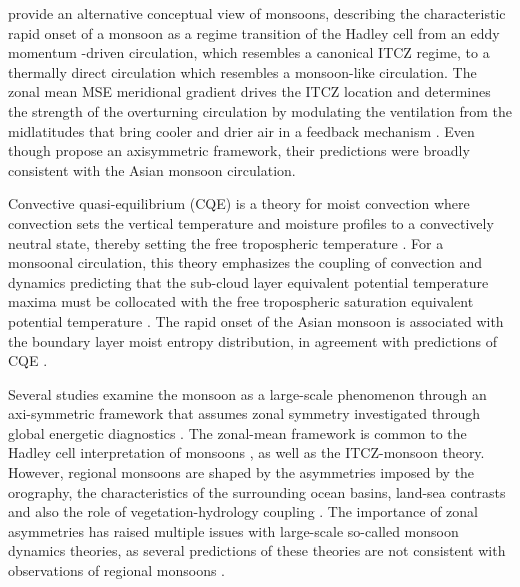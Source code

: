\cite{bordoni2008monsoons} provide an alternative conceptual view of monsoons, describing the characteristic rapid onset of a monsoon as a regime transition of the Hadley cell from an eddy momentum -driven circulation, which resembles a canonical ITCZ regime, to a thermally direct circulation which resembles a monsoon-like circulation. The zonal mean MSE meridional gradient drives the ITCZ location and determines the strength of the overturning circulation by modulating the ventilation from the midlatitudes that bring cooler and drier air in a feedback mechanism \citep{geen2020}. Even though \cite{bordoni2008monsoons} propose an axisymmetric framework, their predictions were broadly consistent with the Asian monsoon circulation. 


Convective quasi-equilibrium (CQE) is a theory for moist convection where convection sets the vertical temperature and moisture profiles to a convectively neutral state, thereby setting the free tropospheric temperature \citep{neelin2007moist}. For a monsoonal circulation, this theory emphasizes the coupling of convection and dynamics predicting that the sub-cloud layer equivalent potential temperature maxima must be collocated with the free tropospheric saturation equivalent potential temperature \citep{nie2010observational,geen2020}. The rapid onset of the Asian monsoon is associated with the boundary layer moist entropy distribution, in agreement with predictions of CQE \citep{nie2010observational,boos2015review,ma2019}.

Several studies examine the monsoon as a large-scale phenomenon through an axi-symmetric framework that assumes zonal symmetry investigated through global energetic diagnostics \citep[e.g.][]{faulk2017effects,geen2019,byrne2020}. The zonal-mean framework is common to the Hadley cell interpretation of monsoons \citep{bordoni2008monsoons}, as well as the ITCZ-monsoon theory. %
However, regional monsoons are shaped by the asymmetries imposed by the orography, the characteristics of the surrounding ocean basins, land-sea contrasts and also the role of vegetation-hydrology coupling \citep{wang2017,pascale2019}. 
The importance of zonal asymmetries has raised multiple issues with large-scale so-called monsoon dynamics theories, as several predictions of these theories are not consistent with observations of regional monsoons \citep[e.g.][]{nie2010observational,smyth2018simulated,biasutti2018global,pascale2019}. 


